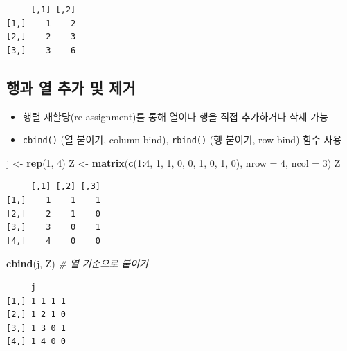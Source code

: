 \documentclass[
  11pt,
]{krantz}
\newenvironment{Shaded}{\begin{snugshade}}{\end{snugshade}}
\newcommand{\CommentTok}[1]{\textcolor[rgb]{0.37,0.37,0.37}{\textit{#1}}}
\newcommand{\DataTypeTok}[1]{\textcolor[rgb]{0.27,0.27,0.27}{#1}}
\newcommand{\DecValTok}[1]{\textcolor[rgb]{0.06,0.06,0.06}{#1}}
\newcommand{\KeywordTok}[1]{\textcolor[rgb]{0.27,0.27,0.27}{\textbf{#1}}}
\newcommand{\NormalTok}[1]{#1}
\newcommand{\OperatorTok}[1]{\textcolor[rgb]{0.43,0.43,0.43}{\textbf{#1}}}
\newcommand{\StringTok}[1]{\textcolor[rgb]{0.5,0.5,0.5}{#1}}
\providecommand{\tightlist}{%
  \setlength{\itemsep}{0pt}\setlength{\parskip}{0pt}}
\begin{document}
\begin{verbatim}
     [,1] [,2]
[1,]    1    2
[2,]    2    3
[3,]    3    6
\end{verbatim}

\normalsize

\hypertarget{uxd589uxacfc-uxc5f4-uxcd94uxac00-uxbc0f-uxc81cuxac70}{%
\subsection{행과 열 추가 및 제거}\label{uxd589uxacfc-uxc5f4-uxcd94uxac00-uxbc0f-uxc81cuxac70}}

\begin{itemize}
\tightlist
\item
  행렬 재할당(re-assignment)를 통해 열이나 행을 직접 추가하거나 삭제 가능
\item
  \texttt{cbind()} (열 붙이기, column bind), \texttt{rbind()} (행 붙이기, row bind) 함수 사용
\end{itemize}

\footnotesize

\begin{Shaded}
\begin{Highlighting}[]
\NormalTok{j <-}\StringTok{ }\KeywordTok{rep}\NormalTok{(}\DecValTok{1}\NormalTok{, }\DecValTok{4}\NormalTok{)}
\NormalTok{Z <-}\StringTok{ }\KeywordTok{matrix}\NormalTok{(}\KeywordTok{c}\NormalTok{(}\DecValTok{1}\OperatorTok{:}\DecValTok{4}\NormalTok{, }\DecValTok{1}\NormalTok{, }\DecValTok{1}\NormalTok{, }\DecValTok{0}\NormalTok{, }\DecValTok{0}\NormalTok{, }\DecValTok{1}\NormalTok{, }\DecValTok{0}\NormalTok{, }\DecValTok{1}\NormalTok{, }\DecValTok{0}\NormalTok{), }\DataTypeTok{nrow =} \DecValTok{4}\NormalTok{, }\DataTypeTok{ncol =} \DecValTok{3}\NormalTok{)}
\NormalTok{Z}
\end{Highlighting}
\end{Shaded}

\begin{verbatim}
     [,1] [,2] [,3]
[1,]    1    1    1
[2,]    2    1    0
[3,]    3    0    1
[4,]    4    0    0
\end{verbatim}

\begin{Shaded}
\begin{Highlighting}[]
\KeywordTok{cbind}\NormalTok{(j, Z) }\CommentTok{# 열 기준으로 붙이기}
\end{Highlighting}
\end{Shaded}

\begin{verbatim}
     j      
[1,] 1 1 1 1
[2,] 1 2 1 0
[3,] 1 3 0 1
[4,] 1 4 0 0
\end{verbatim}
\end{document}
